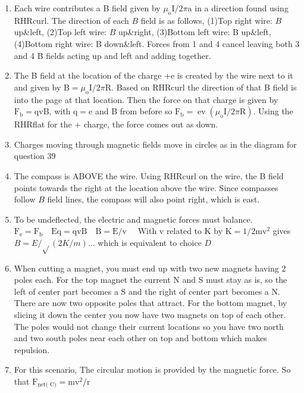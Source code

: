 \begin{enumerate}
\begin{enumerate}
  \item Each wire contributes a B field given by $\mu_{\mathrm{o}} \mathrm{I} / 2 \pi \mathrm{a}$ in a direction found using RHRcurl. The direction of each $B$ field is as follows, (1)Top right wire: $B$ up\&left, (2)Top left wire: $B$ up\&right, (3)Bottom left wire: B up\&left, (4)Bottom right wire: B down\&left. Forces from 1 and 4 cancel leaving both 3 and 4 B fields acting up and left and adding together.
  \item The B field at the location of the charge +e is created by the wire next to it and given by $\mathrm{B}=\mu_{\mathrm{o}} \mathrm{I} / 2 \pi \mathrm{R}$. Based on RHRcurl the direction of that B field is into the page at that location. Then the force on that charge is given by $\mathrm{F}_{\mathrm{b}}=\mathrm{qvB}$, with $\mathrm{q}=\mathrm{e}$ and B from before so $\mathrm{F}_{\mathrm{b}}=\operatorname{ev}\left(\mu_{\mathrm{o}} \mathrm{I} / 2 \pi \mathrm{R}\right)$. Using the RHRflat for the + charge, the force comes out as down.
  \item Charges moving through magnetic fields move in circles as in the diagram for question 39
  \item The compass is ABOVE the wire. Using RHRcurl on the wire, the B field points towards the right at the location above the wire. Since compasses follow $B$ field lines, the compass will also point right, which is east.
  \item To be undeflected, the electric and magnetic forces must balance.\\
$\mathrm{F}_{\mathrm{e}}=\mathrm{F}_{\mathrm{b}} \quad \mathrm{Eq}=\mathrm{qvB} \quad \mathrm{B}=\mathrm{E} / \mathrm{v} \quad$ With v related to K by $\mathrm{K}=1 / 2 \mathrm{mv}^{2}$ gives $B=E / \sqrt{ }(2 K / m) \ldots$ which is equivalent to choice $D$
  \item When cutting a magnet, you must end up with two new magnets having 2 poles each. For the top magnet the current N and S must stay as is, so the left of center part becomes a S and the right of center part becomes a N. There are now two opposite poles that attract. For the bottom magnet, by slicing it down the center you now have two magnets on top of each other. The poles would not change their current locations so you have two north and two south poles near each other on top and bottom which makes repulsion.
  \item For this scenario, The circular motion is provided by the magnetic force. So that $\mathrm{F}_{\text {net( } \mathrm{C})}=\mathrm{mv}^{2} / \mathrm{r}$
\end{enumerate}


\end{enumerate}
